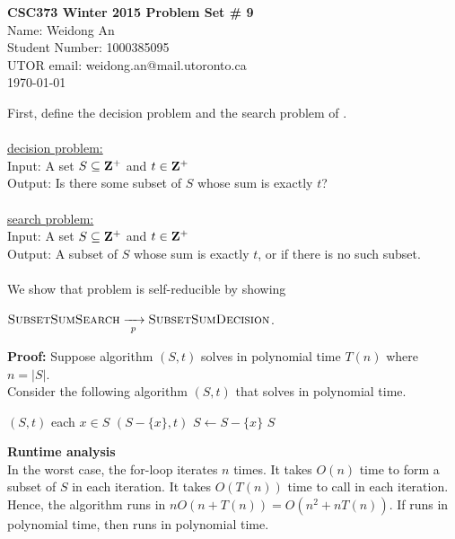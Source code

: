 \documentclass[11pt]{article}
\begin{document}
\begin{center}
{\bf \Large \bf CSC373 Winter 2015 Problem Set \# 9}\\
Name: Weidong An\\
Student Number: 1000385095\\
UTOR email: weidong.an@mail.utoronto.ca\\
\today\\
\end{center}
First, define the decision problem and the search problem of .\\
\\
\underline{ decision problem:}\\
Input: A set $S \subseteq {\bf Z^+}$ and $t \in {\bf Z^+}$\\
Output: Is there some subset of $S$ whose sum is exactly $t$?\\
\\
\underline{ search problem:}\\
Input: A set $S \subseteq {\bf Z^+}$ and $t \in {\bf Z^+}$\\
Output: A subset of $S$ whose sum is exactly $t$, or  if there is no such subset.\\
\\
We show that  problem is self-reducible by showing
\begin{center}
 $\textnormal{\scshape SubsetSumSearch} \xrightarrow[~p~]{} \textnormal{\scshape SubsetSumDecision}$.
\end{center}
{\bf Proof:} Suppose algorithm $(S, t)$ solves  in polynomial time $T(n)$ where $n = |S|$.\\
Consider the following algorithm $(S, t)$ that solves  in polynomial time.
\begin{codebox}
\li {} $(S, t)$
\li    \Then \Return {} \End
\li \For each $x \in S$ \Then
\li     \If {}$(S - \{x\}, t)$
\li          \Then $S \gets S - \{x\}$ \End\End
\li \Return $S$
\end{codebox}
{\bf Runtime analysis}\\
In the worst case, the for-loop iterates $n$ times. It takes $O(n)$ time to form a subset of $S$ in each iteration. It takes $O(T(n))$ time to call  in each iteration. Hence, the algorithm runs in $nO(n + T(n)) = O(n^2+ nT(n))$. If  runs in polynomial time, then  runs in polynomial time.\\
\end{document}
